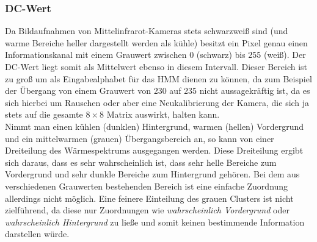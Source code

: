 \subsubsection{DC-Wert}
\label{sec:dc-wert}

Da Bildaufnahmen von Mittelinfrarot-Kameras stets schwarzweiß sind (und warme Bereiche heller dargestellt werden als kühle) besitzt ein Pixel genau einen Informationskanal mit einem Grauwert zwischen 0 (schwarz) bis 255 (weiß).
Der DC-Wert liegt somit als Mittelwert ebenso in diesem Intervall.
Dieser Bereich ist zu groß um als Eingabealphabet für das HMM dienen zu können, da zum Beispiel der Übergang von einem Grauwert von 230 auf 235 nicht aussagekräftig ist, da es sich hierbei um Rauschen oder aber eine Neukalibrierung der Kamera, die sich ja stets auf die gesamte $8 \times 8$ Matrix auswirkt, halten kann.\\

Nimmt man einen kühlen (dunklen) Hintergrund, warmen (hellen) Vordergrund und ein mittelwarmen (grauen) Übergangsbereich an, so kann von einer Dreiteilung des Wärmespektrums ausgegangen werden.
Diese Dreiteilung ergibt sich daraus, dass es sehr wahrscheinlich ist, dass sehr helle Bereiche zum Vordergrund und sehr dunkle Bereiche zum Hintergrund gehören.
Bei dem aus verschiedenen Grauwerten bestehenden Bereich ist eine einfache Zuordnung allerdings nicht möglich. Eine feinere Einteilung des grauen Clusters ist nicht zielführend, da diese nur Zuordnungen wie \textit{wahrscheinlich Vordergrund} oder \textit{wahrscheinlich Hintergrund} zu ließe und somit keinen bestimmende Information darstellen würde.%

